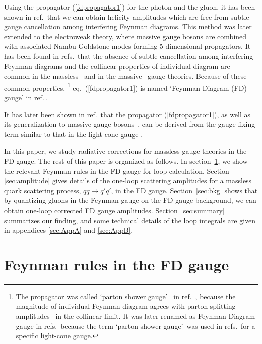 \documentclass[preprint,amsmath,amssymb,superscriptaddress, floatfix,nofootinbib]{revtex4}
\begin{document}
Using the propagator (\ref{fdpropagator1}) for the photon and the gluon, 
it has been shown in ref.\,\cite{Hagiwara:2020tbx} that we can obtain 
helicity amplitudes which are free from subtle gauge cancellation 
among interfering Feynman diagrams.
This method was later extended \cite{Chen:2022gxv} to the electroweak theory, 
where massive gauge bosons are combined with associated Nambu-Goldstone modes 
forming 5-dimensional propagators. 
It has been found in refs.\,\cite{Hagiwara:2020tbx,Chen:2022gxv} that the absence of 
subtle cancellation among interfering Feynman diagrams and the collinear properties 
of individual diagram are common in the massless~\cite{Hagiwara:2020tbx} 
and in the massive~\cite{Chen:2022gxv} gauge theories. 
Because of these common properties,
\footnote{The propagator was called \textquoteleft parton shower gauge\textquoteright~ in 
ref.\,\cite{Hagiwara:2020tbx} , because the magnitude of 
individual Feynman diagram agrees with parton splitting 
amplitudes~\cite{Hagiwara:2009wt} in the collinear limit.
It was later renamed as Feynman-Diagram gauge in 
refs.\,\cite{Chen:2022gxv,Chen:2022xlg} because the term \textquoteleft parton 
shower gauge\textquoteright~was used 
in refs.\,\cite{Nagy:2007ty,Nagy:2014mqa} for a specific light-cone gauge.} 
eq.~(\ref{fdpropagator1}) is named
\textquoteleft Feynman-Diagram (FD) gauge' in ref.\,\cite{Chen:2022gxv}. 

It has later been shown in  ref.\,\cite{Chen:2022xlg} that 
the propagator (\ref{fdpropagator1}), as well as its generalization to massive 
gauge bosons~\cite{Chen:2022gxv}, can be derived from the gauge fixing term 
similar to that in the light-cone gauge \cite{Leibbrandt:1987qv}. 

In this paper, we study radiative corrections for massless gauge theories 
in the FD gauge. 
The rest of this paper is organized as follows. 
In section~\ref{sec:Feynmanrule}, we show the relevant Feynman rules in the FD gauge 
for loop calculation. 
Section \ref{sec:amplitude} gives details of the one-loop scattering amplitudes 
for a massless quark scattering process, $q\bar{q}\to q'\bar{q}'$, in the FD gauge. 
Section~\ref{sec:bkg} shows that by quantizing gluons in the Feynman gauge 
on the FD gauge background, we can obtain one-loop corrected FD gauge amplitudes. 
Section~\ref{sec:summary} summarizes our finding, and some technical details 
of the loop integrals are given in appendices \ref{sec:AppA} and \ref{sec:AppB}. 

\section{Feynman rules in the FD gauge }
\label{sec:Feynmanrule}
\end{document}
